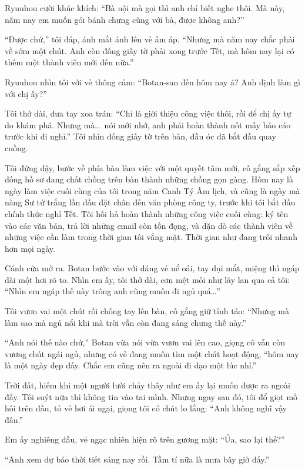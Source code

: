 \documentclass[../main.tex]{subfiles}
\begin{document}
Ryuuhou cười khúc khích: ``Bà nội mà gọi thì anh chỉ biết nghe thôi. Mà này, năm nay em muốn gói bánh chưng cùng với bà, được không anh?''

``Được chứ,'' tôi đáp, ánh mắt ánh lên vẻ ấm áp. ``Nhưng mà năm nay chắc phải về sớm một chút. Anh còn đống giấy tờ phải xong trước Tết, mà hôm nay lại có thêm một thành viên mới đến nữa.''

Ryuuhou nhìn tôi với vẻ thông cảm: ``Botan-san đến hôm nay á? Anh định làm gì với chị ấy?''

Tôi thở dài, đưa tay xoa trán: ``Chỉ là giới thiệu công việc thôi, rồi để chị ấy tự do khám phá. Nhưng mà\dots\ nói mới nhớ, anh phải hoàn thành nốt mấy báo cáo trước khi đi nghỉ.'' Tôi nhìn đống giấy tờ trên bàn, đầu óc đã bắt đầu quay cuồng.

Tôi đứng dậy, bước về phía bàn làm việc với một quyết tâm mới, cố gắng sắp xếp đống hồ sơ đang chất chồng trên bàn thành những chồng gọn gàng. Hôm nay là ngày làm việc cuối cùng của tôi trong năm Canh Tý Âm lịch, và cũng là ngày mà nàng Sư tử trắng lần đầu đặt chân đến văn phòng công ty, trước khi tôi bắt đầu chính thức nghỉ Tết. Tôi hối hả hoàn thành những công việc cuối cùng: ký tên vào các văn bản, trả lời những email còn tồn đọng, và dặn dò các thành viên về những việc cần làm trong thời gian tôi vắng mặt. Thời gian như đang trôi nhanh hơn mọi ngày.

Cánh cửa mở ra. Botan bước vào với dáng vẻ uể oải, tay dụi mắt, miệng thì ngáp dài một hơi rõ to. Nhìn em ấy, tôi thở dài, cơn mệt mỏi như lây lan qua cả tôi: ``Nhìn em ngáp thế này trông anh cũng muốn đi ngủ quá\dots''

Tôi vươn vai một chút rồi chống tay lên bàn, cố gắng giữ tỉnh táo: ``Nhưng mà làm sao mà ngủ nổi khi mà trời vẫn còn đang sáng chưng thế này.''

``Anh nói thế nào chứ,'' Botan vừa nói vừa vươn vai lên cao, giọng cô vẫn còn vương chút ngái ngủ, nhưng có vẻ đang muốn tìm một chút hoạt động, ``hôm nay là một ngày đẹp đấy. Chắc em cũng nên ra ngoài đi dạo một lúc nhỉ.''


Trời đất, hiếm khi một người lười chảy thây như em ấy lại muốn được ra ngoài đấy. Tôi suýt nữa thì không tin vào tai mình. Nhưng ngay sau đó, tôi đổ giọt mồ hôi trên đầu, tỏ vẻ hơi ái ngại, giọng tôi có chút lo lắng: ``Anh không nghĩ vậy đâu.''

Em ấy nghiêng đầu, vẻ ngạc nhiên hiện rõ trên gương mặt: ``Ủa, sao lại thế?''

``Anh xem dự báo thời tiết sáng nay rồi. Tầm tí nữa là mưa bây giờ đấy.''
\end{document}
